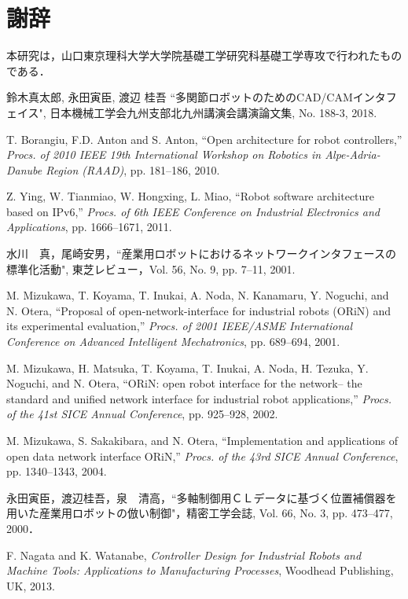 \documentclass{suribt}
\begin{document}
\chapter{謝辞}%
本研究は，山口東京理科大学大学院基礎工学研究科基礎工学専攻で行われたものである．
\begin{thebibliography}{}%
鈴木真太郎, 永田寅臣, 渡辺 桂吾 ``多関節ロボットのためのCAD/CAMインタフェイス", 日本機械工学会九州支部北九州講演会講演論文集, No. 188-3, 2018.

T. Borangiu, F.D. Anton and S. Anton, ``Open architecture for robot controllers,'' {\it Procs. of 2010 IEEE 19th International Workshop on Robotics in Alpe-Adria-Danube Region (RAAD)}, pp. 181--186, 2010.

Z. Ying, W. Tianmiao, W. Hongxing, L. Miao, ``Robot software architecture based on IPv6,'' {\it Procs. of 6th IEEE Conference on Industrial Electronics and Applications}, pp. 1666--1671, 2011.

水川　真，尾崎安男，``産業用ロボットにおけるネットワークインタフェースの標準化活動", 東芝レビュー，Vol. 56, No. 9, pp. 7--11, 2001.

M. Mizukawa, T. Koyama, T. Inukai, A. Noda, N. Kanamaru, Y. Noguchi, and N. Otera, ``Proposal of open-network-interface for industrial robots (ORiN) and its experimental evaluation,'' {\it Procs. of 2001 IEEE/ASME International Conference on Advanced Intelligent Mechatronics}, pp.  689--694, 2001.

M. Mizukawa, H. Matsuka, T. Koyama, T. Inukai, A. Noda, H. Tezuka, Y. Noguchi, and N. Otera, ``ORiN: open robot interface for the network-- the standard and unified network interface for industrial robot applications,'' {\it Procs. of the 41st SICE Annual Conference}, pp.  925--928, 2002.

M. Mizukawa, S. Sakakibara, and N. Otera, ``Implementation and applications of open data network interface ORiN,'' {\it Procs. of the 43rd SICE Annual Conference}, pp. 1340--1343, 2004.

永田寅臣，渡辺桂吾，泉　清高，``多軸制御用ＣＬデータに基づく位置補償器を用いた産業用ロボットの倣い制御"，精密工学会誌, Vol. 66, No. 3, pp. 473--477, 2000．

F. Nagata and K. Watanabe,
{\it Controller Design for Industrial Robots and Machine Tools: Applications to Manufacturing Processes},
Woodhead Publishing, UK, 2013.


\end{thebibliography}
\end{document}
